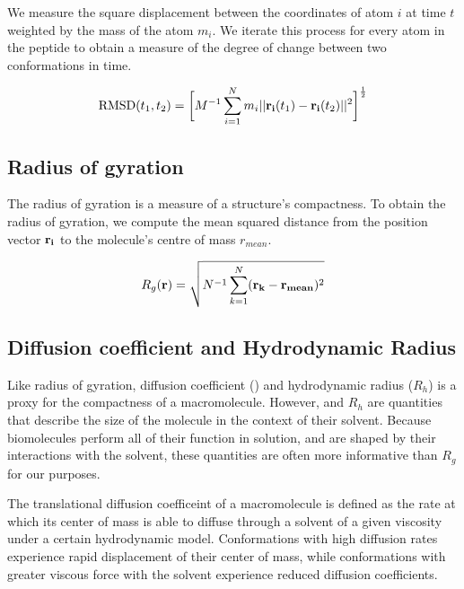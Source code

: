 We measure the square displacement between the coordinates of atom $i$ at time $t$ weighted by the mass of the atom $m_i$. We iterate this process for every atom in the peptide to obtain a measure of the degree of change between two conformations in time.

\begin{equation}
\text{RMSD}(t_1, t_2) = \bigg[ M^{-1} \sum_{i=1}^{N} m_{i} \lvert \lvert \mathbf{r_{i}}(t_{1}) - \mathbf{r_{i}}(t_{2}) \rvert \rvert^2 \bigg]^\frac{1}{2}
\end{equation}


\subsection{Radius of gyration}

The radius of gyration is a measure of a structure's compactness. To obtain the radius of gyration, we compute the mean squared distance from the position vector $\mathbf{r_i}$ to the molecule's centre of mass $r_{mean}$.

\begin{equation}
R_g(\mathbf{r}) = \sqrt{N^{-1} \sum_{k=1}^{N} (\mathbf{r_k} - \mathbf{r_{mean}})^2}
\end{equation}

\subsection{Diffusion coefficient and Hydrodynamic Radius}

Like radius of gyration, diffusion coefficient (\diffusion) and hydrodynamic radius ($R_h$) is a proxy for the compactness of a macromolecule. However, \diffusion and $R_h$ are quantities that describe the size of the molecule in the context of their solvent. Because biomolecules perform all of their function in solution, and are shaped by their interactions with the solvent, these quantities are often more informative than $R_g$ for our purposes.

The translational diffusion coefficeint of a macromolecule is defined as the rate at which its center of mass is able to diffuse through a solvent of a given viscosity under a certain hydrodynamic model. Conformations with high diffusion rates experience rapid displacement of their center of mass, while conformations with greater viscous force with the solvent experience reduced diffusion coefficients. 

